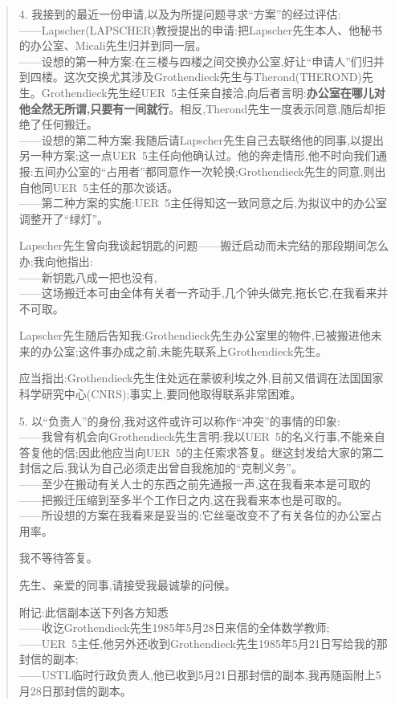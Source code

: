 \begin{quote}
4. 我接到的最近一份申请,以及为所提问题寻求“方案”的经过评估:\\
——Lapscher(LAPSCHER)教授提出的申请:把Lapscher先生本人、他秘书的办公室、Micali先生归并到同一层。\\
——设想的第一种方案:在三楼与四楼之间交换办公室,好让“申请人”们归并到四楼。这次交换尤其涉及Grothendieck先生与Therond(THEROND)先生。Grothendieck先生经UER~5主任亲自接洽,\dmark{}向后者言明:\textbf{办公室在哪儿对他全然无所谓,只要有一间就行}。相反,Therond先生一度表示同意,随后却拒绝了任何搬迁。\\
——设想的第二种方案:我随后请Lapscher先生自己去联络他的同事,以提出另一种方案;这一点UER~5主任向他确认过。他的奔走情形,他不时向我们通报:五间办公室的“占用者”都同意作一次轮换;Grothendieck先生的同意,则出自他同UER~5主任的那次谈话。\\
——第二种方案的实施:UER~5主任得知这一致同意之后,为拟议中的办公室调整开了“绿灯”。

Lapscher先生曾向我谈起钥匙的问题——搬迁启动而未完结的那段期间怎么办;我向他指出:\\
——新钥匙八成一把也没有,\\
——这场搬迁本可由全体有关者一齐动手,几个钟头做完,拖长它,在我看来并不可取。

Lapscher先生随后告知我:Grothendieck先生办公室里的物件,已被搬进他未来的办公室;这件事办成之前,未能先联系上Grothendieck先生。

应当指出:Grothendieck先生住处远在蒙彼利埃之外,目前又借调在法国国家科学研究中心(CNRS);事实上,要同他取得联系非常困难。

5. 以“负责人”的身份,我对这件或许可以称作“冲突”的事情的印象:\\
——我曾有机会向Grothendieck先生言明:我以UER~5的名义行事,不能亲自答复他的信;因此他应当向UER~5的主任索求答复。继这封发给大家的第二封信之后,我认为自己必须走出曾自我施加的“克制义务”。\\
——至少在搬动有关人士的东西之前先通报一声,这在我看来本是可取的\\
——把搬迁压缩到至多半个工作日之内,这在我看来本也是可取的。\\
——所设想的方案在我看来是妥当的:它丝毫改变不了有关各位的办公室占用率。

我不等待答复。

先生、亲爱的同事,请接受我最诚挚的问候。

附记:此信副本送下列各方知悉\\
——收讫Grothendieck先生1985年5月28日来信的全体数学教师;\\
——UER~5主任,他另外还收到Grothendieck先生1985年5月21日写给我的那封信的副本;\\
——USTL临时行政负责人,他已收到5月21日那封信的副本,我再随函附上5月28日那封信的副本。
\end{quote}

